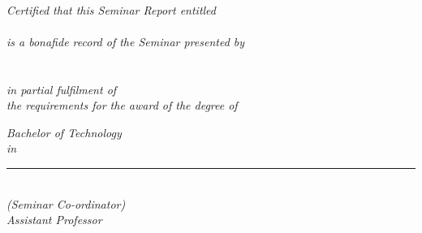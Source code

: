 \clearpage
\thispagestyle{empty}

\begin{center}

\Large \textbf{\myCollegeName{}}\par
\large \textbf{\myDeptName{}}\\[1.0cm]

\emph{Certified that this Seminar Report entitled}\\[0.5cm]

\Huge \textbf{\myTopic{}}\\[1.0cm]

\large \emph{is a bonafide record of the Seminar presented by}\\[1.0cm]

\normalsize \textbf{\myName{}\\
	\myRollNo{}}\\[2.5cm]

\large \emph{in partial fulfilment of\\
	the requirements for the award of the degree of}

\Large \emph{Bachelor of Technology}\\
\small \emph{in}\par
\large \emph{\myBranchName{}}

\vfill
\hrule
\vspace{2.0cm}

{\onehalfspacing
\large \textbf{\mySeminarCoordinator{}}\\

\small
\emph{
	(Seminar Co-ordinator)\\
	Assistant Professor\\
	\myDeptName{}}}

\end{center}
